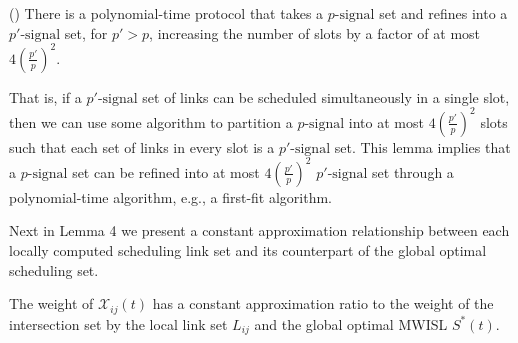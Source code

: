 \documentclass[journal]{IEEEtran}
\begin{document}
\begin{lemma}
(\cite{S:phy8}) There is a polynomial-time protocol that takes a $p\mbox{-signal}$ set
and refines into a $p'\mbox{-signal}$ set, for $p'>p$, increasing the number of slots by a factor of at
most $4(\frac{p'}{p})^2$.
\label{lemma3}
\end{lemma}

That is, if a $p'\mbox{-signal}$ set of links can be scheduled simultaneously in a single slot, then we can  use some algorithm to partition a $p\mbox{-signal}$ into  at most $4(\frac{p'}{p})^2$ slots such that each set of links in every slot is a $p'\mbox{-signal}$ set.
This lemma implies that a $p\mbox{-signal}$ set can be refined into at most $4(\frac{p'}{p})^2$ $p'\mbox{-signal}$ set through a polynomial-time algorithm, e.g., a first-fit algorithm.

Next in Lemma 4 we present a constant approximation relationship
between each locally computed scheduling link set and its counterpart of the global optimal
scheduling set.
\begin{lemma}
The weight of $\mathcal{X}_{ij} (t)$ has a constant approximation ratio to the weight of the intersection set by the local link set $L_{ij} $ and the global optimal MWISL $S^\ast (t)$.
\label{lemma4}
\end{lemma}
\end{document}
